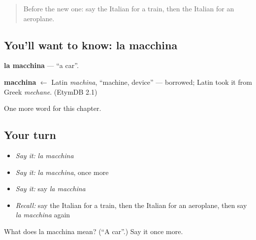 \begin{quote}
Before the new one: say the Italian for a train, then the Italian for an aeroplane.
\end{quote}

\subsection*{You'll want to know: la macchina}
\textbf{la macchina} — \textquotedblleft{}a car\textquotedblright{}.

\begin{cousinweb}
\textbf{macchina} $\leftarrow$ Latin \emph{machina}, \textquotedblleft{}machine, device\textquotedblright{} — borrowed; Latin took it from Greek \emph{mechane}. (EtymDB 2.1)
\end{cousinweb}

\begin{grammarlens}[title={What you've built}]
One more word for this chapter.
\end{grammarlens}

\subsection*{Your turn}
\begin{itemize}
\raggedright
  \item \emph{Say it:} \emph{la macchina}
  \item \emph{Say it:} \emph{la macchina}, once more
  \item \emph{Say it:} say \emph{la macchina}
  \item \emph{Recall:} say the Italian for a train, then the Italian for an aeroplane, then say \emph{la macchina} again
\end{itemize}

\begin{tcolorbox}[breakable,colback=teal!4,colframe=teal!35!black,title={Before you move on}]
What does la macchina mean? (\textquotedblleft{}A car\textquotedblright{}.) Say it once more.
\end{tcolorbox}
